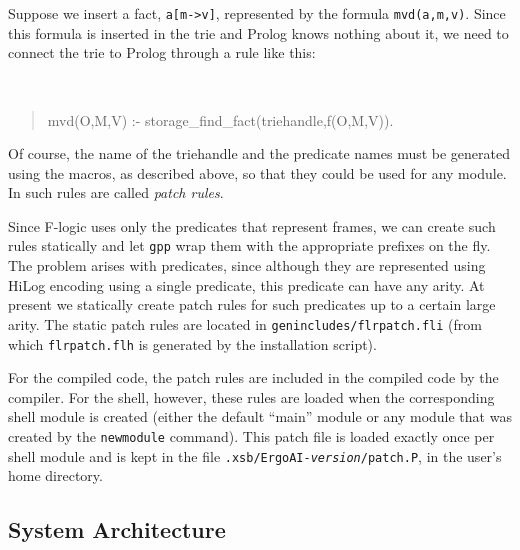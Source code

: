 \documentclass[11pt]{article}
\newcommand{\ERGO}{\mbox{\smaller{\ensuremath{\cal{E}}\smaller{{\sc{RGO}}}}}\xspace}
\newcommand{\FLSYSTEM}{\ERGO}
\newcommand{\fl}{\mbox{F-logic}\xspace}
\begin{document}
Suppose we insert a fact, {\tt a[m->v]}, represented by the formula
{\tt mvd(a,m,v)}. Since this formula is inserted in the trie and Prolog knows
nothing about it, we need to connect the trie to Prolog through a rule like
this:
{\tt
\begin{quote}
  mvd(O,M,V) :- storage\_find\_fact(triehandle,f(O,M,V)).
\end{quote}
}
Of course, the name of the triehandle and the predicate names must be
generated using the macros, as described above, so that they could be used
for any module. In \FLSYSTEM such rules are called \emph{patch rules}. 

Since \fl uses only the predicates that represent frames, we can
create such rules statically and let {\tt gpp} wrap them with the
appropriate prefixes on the fly.  The problem arises with predicates, since
although they are represented using HiLog encoding using a single
predicate, this predicate can have any arity.  At present we statically
create patch rules for such predicates up to a certain large arity.  The
static patch rules are located in {\tt genincludes/flrpatch.fli} (from
which {\tt flrpatch.flh} is generated by the \FLSYSTEM installation script).

For the compiled code, the patch rules are included in the compiled code
by the \FLSYSTEM compiler. For the \FLSYSTEM shell, however, these rules are
loaded when the corresponding shell module is created (either the default
``main'' module or any module that was created by the {\tt newmodule}
command). This patch file is loaded exactly once per shell module and is
kept in the file {\tt .xsb/ErgoAI-\emph{version}/patch.P}, in the user's home directory.


\subsection{System Architecture}
\end{document}
